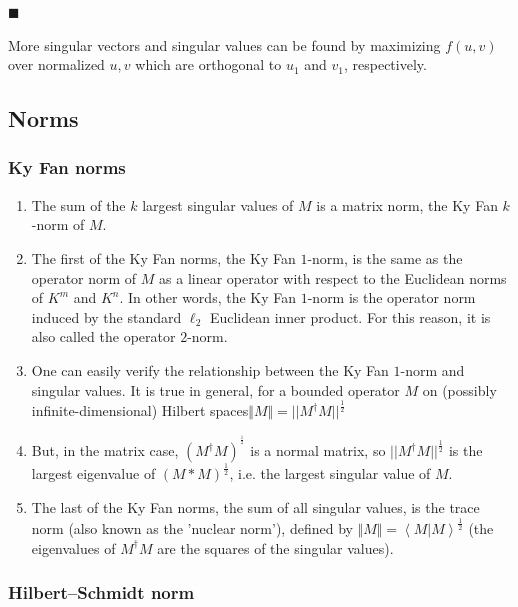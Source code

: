 \documentclass[aps,preprint]{revtex4}%
\begin{document}
$\blacksquare$

More singular vectors and singular values can be found by maximizing $f(u,v)$
over normalized $u,v$ which are orthogonal to $u_{1}$ and $v_{1}$, respectively.

\subsection{Norms}

\subsubsection{Ky Fan norms}

\begin{enumerate}
\item The sum of the $k$ largest singular values of $M$ is a matrix norm, the
Ky Fan $k$-norm of $M$.

\item The first of the Ky Fan norms, the Ky Fan $1$-norm, is the same as the
operator norm of $M$ as a linear operator with respect to the Euclidean norms
of $K^{m}$ and $K^{n}$. In other words, the Ky Fan $1$-norm is the operator
norm induced by the standard $\ell_{2}$ Euclidean inner product. For this
reason, it is also called the operator $2$-norm.

\item One can easily verify the relationship between the Ky Fan $1$-norm and
singular values. It is true in general, for a bounded operator $M$ on
(possibly infinite-dimensional) Hilbert spaces$\Vert M\Vert=||M^{\dagger
}M||^{\frac{1}{2}}$

\item But, in the matrix case, $\left(  M^{\dagger}M\right)  ^{^{\frac{1}{2}}%
}$ is a normal matrix, so $||M^{\dagger}M||^{\frac{1}{2}}$ is the largest
eigenvalue of $(M\ast M)^{\frac{1}{2}}$, i.e. the largest singular value of
$M$.

\item The last of the Ky Fan norms, the sum of all singular values, is the
trace norm (also known as the 'nuclear norm'), defined by $\Vert
M\Vert=\left\langle \left.  M\right\vert M\right\rangle ^{\frac{1}{2}}$ (the
eigenvalues of $M^{\dagger}M$ are the squares of the singular values).
\end{enumerate}

\subsubsection{Hilbert--Schmidt norm}
\end{document}
